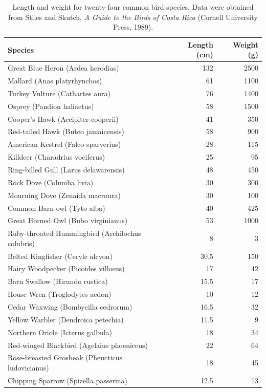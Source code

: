 \documentclass[../book.tex]{subfiles}
\begin{document}
\begin{table}[htbp]
  \centering
  \small
  \begin{tabular}{lrr}
    \toprule
    Species & Length (cm) & Weight (g) \\
    \midrule
    Great Blue Heron (Ardea herodias) & 132 & 2500 \\
    Mallard (Anas platyrhynchos) & 61 & 1100 \\
    Turkey Vulture (Cathartes aura) & 76 & 1400 \\
    Osprey (Pandion haliaetus) & 58 & 1500 \\
    Cooper's Hawk (Accipiter cooperii) & 41 & 350 \\
    Red-tailed Hawk (Buteo jamaicensis) & 58 & 900 \\
    American Kestrel (Falco sparverius) & 28 & 115 \\
    Killdeer (Charadrius vociferus) & 25 & 95 \\
    Ring-billed Gull (Larus delawarensis) & 48 & 450 \\
    Rock Dove (Columba livia) & 30 & 300 \\
    Mourning Dove (Zenaida macroura) & 30 & 100 \\
    Common Barn-owl (Tyto alba) & 40 & 425 \\
    Great Horned Owl (Bubo virginianus) & 53 & 1000 \\
    Ruby-throated Hummingbird (Archilochus colubris) & 8 & 3 \\
    Belted Kingfisher (Ceryle alcyon) & 30.5 & 150 \\
    Hairy Woodpecker (Picoides villosus) & 17 & 42 \\
    Barn Swallow (Hirundo rustica) & 15.5 & 17 \\
    House Wren (Troglodytes aedon) & 10 & 12 \\
    Cedar Waxwing (Bombycilla cedrorum) & 16.5 & 32 \\
    Yellow Warbler (Dendroica petechia) & 11.5 & 9 \\
    Northern Oriole (Icterus galbula) & 18 & 34 \\
    Red-winged Blackbird (Agelaius phoeniceus) & 22 & 64 \\
    Rose-breasted Grosbeak (Pheucticus ludovicianus) & 18 & 45 \\
    Chipping Sparrow (Spizella passerina) & 12.5 & 13 \\
    \bottomrule
  \end{tabular}
  \caption{Length and weight for twenty-four common bird species. Data were obtained from Stiles and Skutch, \emph{A Guide to the Birds of Costa Rica} (Cornell University Press, 1989).}
  \label{table:birds}
\end{table}
\end{document}
